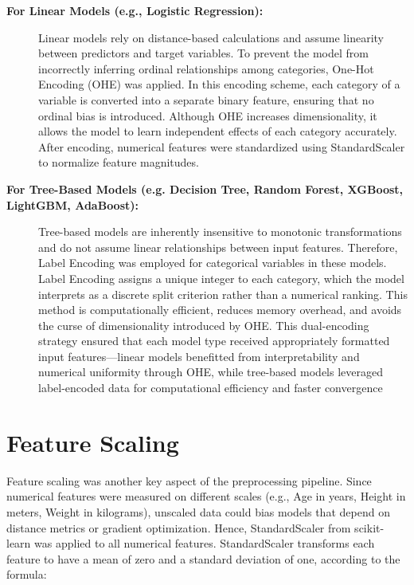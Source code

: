 \begin{description}
    \item[\textbf{For Linear Models (e.g., Logistic Regression):}]
    Linear models rely on distance-based calculations and assume linearity between predictors and target variables.
    To prevent the model from incorrectly inferring ordinal relationships among categories, One-Hot Encoding (OHE) was applied.
    In this encoding scheme, each category of a variable is converted into a separate binary feature, ensuring that no ordinal bias is introduced.
    Although OHE increases dimensionality, it allows the model to learn independent effects of each category accurately.
    After encoding, numerical features were standardized using StandardScaler to normalize feature magnitudes.

    \item[\textbf{For Tree-Based Models (e.g. Decision Tree, Random Forest, XGBoost, LightGBM, AdaBoost):}]
    Tree-based models are inherently insensitive to monotonic transformations and do not assume linear relationships between input features.
    Therefore, Label Encoding was employed for categorical variables in these models.
    Label Encoding assigns a unique integer to each category, which the model interprets as a discrete split criterion rather than a numerical ranking.
    This method is computationally efficient, reduces memory overhead, and avoids the curse of dimensionality introduced by OHE. This dual-encoding strategy ensured that each model type received appropriately formatted input features—linear models benefitted from interpretability and numerical uniformity through OHE, while tree-based models leveraged label-encoded data for computational efficiency and faster convergence
\end{description}



\section{Feature Scaling}\label{sec:feature-scaling}

Feature scaling was another key aspect of the preprocessing pipeline.
Since numerical features were measured on different scales (e.g., Age in years, Height in meters, Weight in kilograms), unscaled data could bias models that depend on distance metrics or gradient optimization.
Hence, StandardScaler from scikit-learn was applied to all numerical features.
StandardScaler transforms each feature to have a mean of zero and a standard deviation of one, according to the formula:

